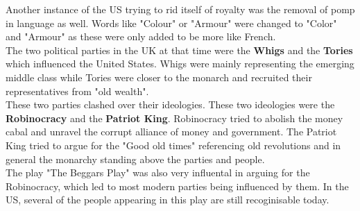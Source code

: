 \documentclass{article}
\begin{document}
	Another instance of the US trying to rid itself of royalty was the removal of pomp in language as well. Words like "Colour" or "Armour" were changed to "Color" and "Armour" as these were only added to be more like French. \\
	The two political parties in the UK at that time were the \textbf{Whigs} and the \textbf{Tories} which influenced the United States. Whigs were mainly representing the emerging middle class while Tories were closer to the monarch and recruited their representatives from "old wealth". \\
	These two parties clashed over their ideologies. These two ideologies were the \textbf{Robinocracy} and the \textbf{Patriot King}. Robinocracy tried to abolish the money cabal and unravel the corrupt alliance of money and government. The Patriot King tried to argue for the "Good old times" referencing old revolutions and in general the monarchy standing above the parties and people. \\
	The play "The Beggars Play" was also very influental in arguing for the Robinocracy, which led to most modern parties being influenced by them. In the US, several of the people appearing in this play are still recoginisable today. \\
\end{document}

